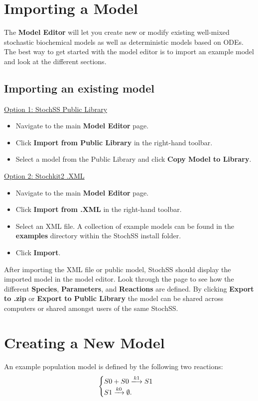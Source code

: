 \section{\label{sec:imp} Importing a Model}
The \textbf{Model Editor} will let you create new or modify existing well-mixed stochastic biochemical models as well as deterministic models based on ODEs.
The best way to get started with the model editor is to import an example model and look at the different sections.

\subsection{Importing an existing model}

\underline{Option 1: StochSS Public Library}
\begin{itemize}
  \item Navigate to the main \textbf{Model Editor} page.
  \item Click \textbf{Import from Public Library} in the right-hand toolbar.
  \item Select a model from the Public Library and click \textbf{Copy Model to Library}.
\end{itemize}

\noindent\underline{Option 2: Stochkit2 .XML}
\begin{itemize}
  \item Navigate to the main \textbf{Model Editor} page.
  \item Click \textbf{Import from .XML} in the right-hand toolbar.
  \item Select an XML file. A collection of example models can be found in the \textbf{examples} directory within the StochSS install folder.
  \item Click \textbf{Import}.
\end{itemize}

After importing the XML file or public model, StochSS should display the imported model in the model editor.
Look through the page to see how the different \textbf{Species}, \textbf{Parameters}, and \textbf{Reactions} are defined.
By clicking \textbf{Export to .zip} or \textbf{Export to Public Library} the model can be shared across computers or shared amongst users of the same StochSS.

\section{Creating a New Model}
An example population model is defined by the following two reactions:
\[ \begin{cases}
S0 + S0 \xlongrightarrow{k1} S1 \nonumber \\
S1 \xrightarrow{k0} \emptyset . \nonumber 
\end{cases} \]

